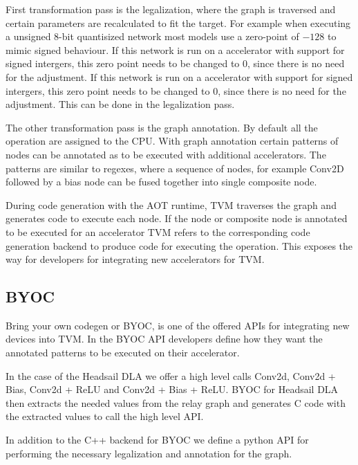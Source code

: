 \documentclass[12pt,a4paper,english
]{tunithesis}
\begin{document}
First transformation pass is the legalization, where the graph is traversed and certain parameters are recalculated to fit the target. For example when executing a unsigned 8-bit quantisized network most models use a zero-point of $-128$ to mimic signed behaviour. If this network is run on a accelerator with support for signed intergers, this zero point needs to be changed to 0, since there is no need for the adjustment. If this network is run on a accelerator with support for signed intergers, this zero point needs to be changed to 0, since there is no need for the adjustment. This can be done in the legalization pass.

The other transformation pass is the graph annotation. By default all the operation are assigned to the CPU. With graph annotation certain patterns of nodes can be annotated as to be executed with additional accelerators. The patterns are similar to regexes, where a sequence of nodes, for example Conv2D followed by a bias node can be fused together into single composite node.

During code generation with the AOT runtime, TVM traverses the graph and generates code to execute each node. If the node or composite node is annotated to be executed for an accelerator TVM refers to the corresponding code generation backend to produce code for executing the operation. This exposes the way for developers for integrating new accelerators for TVM.

\subsection{BYOC}
Bring your own codegen or BYOC, is one of the offered APIs for integrating new devices into TVM. In the BYOC API developers define how they want the annotated patterns to be executed on their accelerator.

In the case of the Headsail DLA we offer a high level calls Conv2d, Conv2d + Bias, Conv2d + ReLU and Conv2d + Bias + ReLU. BYOC for Headsail DLA then extracts the needed values from the relay graph and generates C code with the extracted values to call the high level API.

In addition to the C++ backend for BYOC we define a python API for performing the necessary legalization and annotation for the graph.
\end{document}
